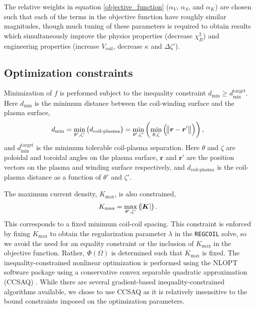 \documentclass[aps,unsortedaddress]{revtex4-1}
\begin{document}
The relative weights in equation \ref{objective_function} ($\alpha_V$, $\alpha_S$, and $\alpha_K$) are chosen such that each of the terms in the objective function have roughly similar magnitudes, though much tuning of these parameters is required to obtain results which simultaneously improve the physics properties (decrease $\chi^2_B$) and engineering properties (increase $V_{\text{coil}}$, decrease $\kappa$ and $\Delta \zeta'$).

\FloatBarrier
\subsection{Optimization constraints}
\label{sect_constraint}

Minimization of $f$ is performed subject to the inequality constraint $d_{\text{min}} \geq d_{\text{min}}^{\text{target}}$. Here $d_{\text{min}}$ is the minimum distance between the coil-winding surface and the plasma surface,
\begin{gather}
d_{\text{min}} = \min_{\theta',\zeta'} \left( d_{\text{coil-plasma}} \right) = \min_{\theta',\zeta'} \left( \min_{\theta, \zeta} \left( \norm{ \bm{r} - \bm{r}' } \right) \right),
\end{gather}
and $d_{\text{min}}^{\text{target}}$ is the minimum tolerable coil-plasma separation. Here $\theta$ and $\zeta$ are poloidal and toroidal angles on the plasma surface, $\bm{r}$ and $\bm{r}'$ are the position vectors on the plasma and winding surface respectively, and $d_{\text{coil-plasma}}$ is the coil-plasma distance as a function of $\theta'$ and $\zeta'$. 

The maximum current density, $K_{\text{max}}$, is also constrained,
\begin{gather}
K_{\text{max}} = \max_{\theta',\zeta'} \left( \abs{\bm{K}} \right).
\end{gather}
This corresponds to a fixed minimum coil-coil spacing. This constraint is enforced by fixing $K_{\text{max}}$ to obtain the regularization parameter $\lambda$ in the \texttt{REGCOIL} solve, so we avoid the need for an equality constraint or the inclusion of $K_{\text{max}}$ in the objective function. Rather, $\Phi(\Omega)$ is determined such that $K_{\text{max}}$ is fixed. The inequality-constrained nonlinear optimization is performed using the NLOPT \cite{NLOPT} software package using a conservative convex separable quadratic approximation (CCSAQ) \cite{Svanberg2002}. While there are several gradient-based inequality-constrained algorithms available, we chose to use CCSAQ as it is relatively insensitive to the bound constraints imposed on the optimization parameters. 
\end{document}

